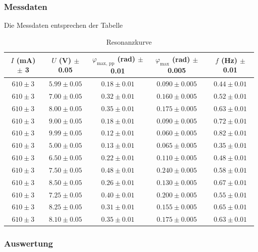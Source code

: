 \documentclass{article}
\begin{document}
\subsubsection{Messdaten}
Die Messdaten entsprechen der Tabelle
\begin{table}[H]
    \centering
    \begin{tabular}{|c|c|c|c|c|}
    \hline
    $I$ (mA) $\pm$ 3 & $U$ (V) $\pm$ 0.05 & $\varphi_{\text{max, pp}}$ (rad) $\pm$ 0.01 & $\varphi_{\text{max}}$ (rad) $\pm$ 0.005 & $f$ (Hz) $\pm$ 0.01 \\
    \hline
    $610 \pm 3$ & $5.99 \pm 0.05$ & $0.18 \pm 0.01$ & $0.090 \pm 0.005$ & $0.44 \pm 0.01$ \\
    $610 \pm 3$ & $7.00 \pm 0.05$ & $0.32 \pm 0.01$ & $0.160 \pm 0.005$ & $0.52 \pm 0.01$ \\
    $610 \pm 3$ & $8.00 \pm 0.05$ & $0.35 \pm 0.01$ & $0.175 \pm 0.005$ & $0.63 \pm 0.01$ \\
    $610 \pm 3$ & $9.00 \pm 0.05$ & $0.18 \pm 0.01$ & $0.090 \pm 0.005$ & $0.72 \pm 0.01$ \\
    $610 \pm 3$ & $9.99 \pm 0.05$ & $0.12 \pm 0.01$ & $0.060 \pm 0.005$ & $0.82 \pm 0.01$ \\
    $610 \pm 3$ & $5.00 \pm 0.05$ & $0.13 \pm 0.01$ & $0.065 \pm 0.005$ & $0.35 \pm 0.01$ \\
    $610 \pm 3$ & $6.50 \pm 0.05$ & $0.22 \pm 0.01$ & $0.110 \pm 0.005$ & $0.48 \pm 0.01$ \\
    $610 \pm 3$ & $7.50 \pm 0.05$ & $0.48 \pm 0.01$ & $0.240 \pm 0.005$ & $0.58 \pm 0.01$ \\
    $610 \pm 3$ & $8.50 \pm 0.05$ & $0.26 \pm 0.01$ & $0.130 \pm 0.005$ & $0.67 \pm 0.01$ \\
    $610 \pm 3$ & $7.25 \pm 0.05$ & $0.40 \pm 0.01$ & $0.200 \pm 0.005$ & $0.55 \pm 0.01$ \\
    $610 \pm 3$ & $8.25 \pm 0.05$ & $0.31 \pm 0.01$ & $0.155 \pm 0.005$ & $0.65 \pm 0.01$ \\
    $610 \pm 3$ & $8.10 \pm 0.05$ & $0.35 \pm 0.01$ & $0.175 \pm 0.005$ & $0.63 \pm 0.01$ \\
    \hline
    \end{tabular}
    \caption{Resonanzkurve}
    \label{tab:resonanzkurve}
\end{table}

\subsubsection{Auswertung}
\end{document}
